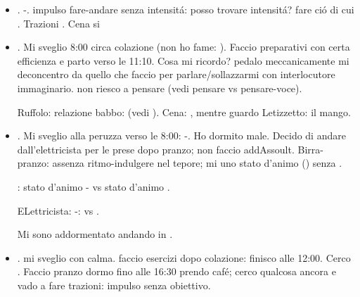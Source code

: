 \begin{itemize}
Dopo attacco allergia inizio ricerca ''Black panther'' - ;  opposto teatro: la ragazza \'e passabile, sono in camera da letto, l'atmosfera \'e rilassante; .

\item {}. -. impulso fare-andare senza intensit\'a: posso trovare intensit\'a? fare ci\'o di cui 
. Trazioni . Cena si 

\item {}. Mi sveglio 8:00 circa colazione (non ho fame: ). Faccio preparativi con certa efficienza e parto verso le 11:10. Cosa mi ricordo? pedalo meccanicamente mi deconcentro da quello che faccio per parlare/sollazzarmi con interlocutore immaginario.  non riesco a pensare (vedi pensare vs pensare-voce).

Ruffolo: relazione babbo:  (vedi ).
Cena: ,  mentre guardo Letizzetto:  il mango.

\item {}. Mi sveglio alla peruzza verso le 8:00: -. Ho dormito male. Decido di andare dall'elettricista per le prese dopo pranzo; non faccio addAssoult. Birra-pranzo: assenza ritmo-indulgere nel tepore;  mi uno stato d'animo () senza .

: stato d'animo - vs stato d'animo .

ELettricista: -:  vs .

Mi sono addormentato andando in .

\item {}. mi sveglio con calma. faccio esercizi dopo colazione: finisco alle 12:00. Cerco . Faccio pranzo dormo fino alle 16:30 prendo caf\'e; cerco qualcosa ancora e vado a fare trazioni: impulso  senza obiettivo.


\end{itemize}
